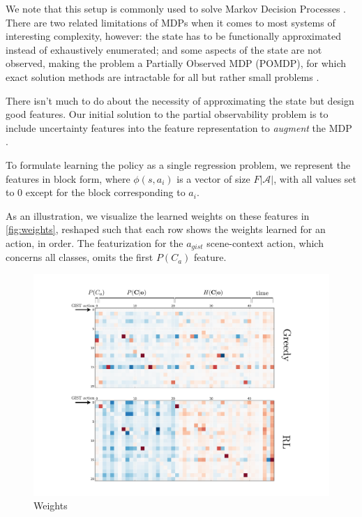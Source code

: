 We note that this setup is commonly used to solve Markov Decision Processes \cite{Sutton1998}.
There are two related limitations of MDPs when it comes to most systems of interesting complexity, however: the state has to be functionally approximated instead of exhaustively enumerated; and some aspects of the state are not observed, making the problem a Partially Observed MDP (POMDP), for which exact solution methods are intractable for all but rather small problems \cite{Roy2002}.

There isn't much to do about the necessity of approximating the state but design good features.
Our initial solution to the partial observability problem is to include uncertainty features into the feature representation to \emph{augment} the MDP \cite{Kwok2004}.

To formulate learning the policy as a single regression problem, we represent the features in block form, where $\phi(s,a_i)$ is a vector of size $F|\mathcal{A}|$, with all values set to $0$ except for the block corresponding to $a_i$.

As an illustration, we visualize the learned weights on these features in \autoref{fig:weights}, reshaped such that each row shows the weights learned for an action, in order.
The featurization for the $a_{gist}$ scene-context action, which concerns all classes, omits the first $P(C_a)$ feature.

\begin{figure}[h!]
\centering
\includegraphics[width=0.87\linewidth]{../figures/weights.pdf}
\caption{Weights }
\label{fig:weights}
\end{figure}

